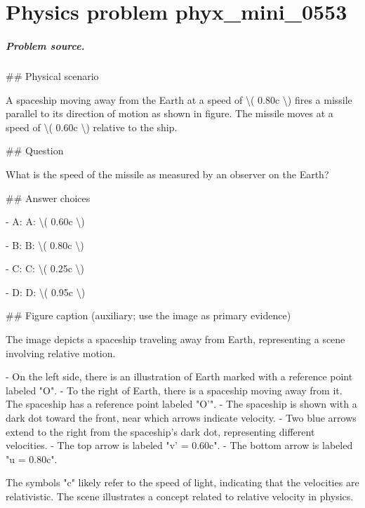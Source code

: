 
\chapter{Physics problem phyx\_mini\_0553}
\label{ch:PhyXMiniProblems_problem_phyx_mini_0553}

\paragraph{Problem source.}
\#\# Physical scenario

A spaceship moving away from the Earth at a speed of \textbackslash{}( 0.80c \textbackslash{}) fires a missile parallel to its direction of motion as shown in figure. The missile moves at a speed of \textbackslash{}( 0.60c \textbackslash{}) relative to the ship.

\#\# Question

What is the speed of the missile as measured by an observer on the Earth?

\#\# Answer choices

- A: A: \textbackslash{}( 0.60c \textbackslash{})

- B: B: \textbackslash{}( 0.80c \textbackslash{})

- C: C: \textbackslash{}( 0.25c \textbackslash{})

- D: D: \textbackslash{}( 0.95c \textbackslash{})

\#\# Figure caption (auxiliary; use the image as primary evidence)

The image depicts a spaceship traveling away from Earth, representing a scene involving relative motion.

- On the left side, there is an illustration of Earth marked with a reference point labeled "O".
- To the right of Earth, there is a spaceship moving away from it. The spaceship has a reference point labeled "O'".
- The spaceship is shown with a dark dot toward the front, near which arrows indicate velocity.
- Two blue arrows extend to the right from the spaceship’s dark dot, representing different velocities.
  - The top arrow is labeled "v' = 0.60c".
  - The bottom arrow is labeled "u = 0.80c".
  
The symbols "c" likely refer to the speed of light, indicating that the velocities are relativistic. The scene illustrates a concept related to relative velocity in physics.

